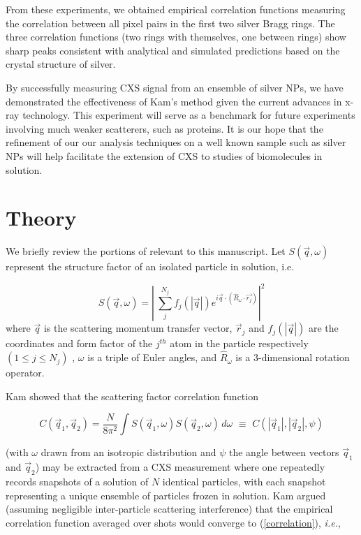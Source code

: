 \documentclass [11pt,fleqn]{article}
\def \be {\begin{equation}}
\def \ee {\end{equation}}
\begin{document}
From these experiments, we obtained empirical correlation functions measuring the correlation between all pixel pairs in the first two silver Bragg rings. The three correlation functions (two rings with themselves, one between rings) show sharp peaks consistent with analytical and simulated predictions based on the crystal structure of silver.

By successfully measuring CXS signal from an ensemble of silver NPs, we have demonstrated the effectiveness of Kam's method given the current advances in x-ray technology. This experiment will serve as a benchmark for future experiments involving much weaker scatterers, such as proteins. It is our hope that the refinement of our our analysis techniques on a well known sample such as silver NPs will help facilitate the extension of CXS to studies of biomolecules in solution.

\section{Theory}

We briefly review the portions of \cite{Kam:1977wc} relevant to this manuscript. Let $S( \vec{q},\omega)$ represent the structure factor of an isolated particle in solution, i.e.

\be \label{structurefactor}
S(\vec{q},\omega) = \left| \> \sum_{j}^{N_j} f_j (|\vec{q}| )e^{i \vec{q} \cdot  \left( \hat{R}_\omega \cdot \vec{r_j}\right)  } \right| ^{2}
\ee
where $\vec{q}$ is the scattering momentum transfer vector,  $\vec{r}_{j}$ and $f_j (|\vec{q}| )$ are the coordinates and form factor of the $j^{th}$ atom in the particle respectively $( 1 \leq j \leq N_{j} )$ , $\omega$ is a triple of Euler angles, and $\hat{R}_\omega$ is a 3-dimensional rotation operator.

Kam showed that the scattering factor correlation function

\be \label{correlation}
C(\vec{q}_1, \vec{q}_2) = \frac{N}{8 \pi^{2}}\int S( \vec{q}_{1},\omega ) S( \vec{q}_{2},\omega ) \, d \omega \,\, \equiv\,\, C(|\vec{q}_1|, |\vec{q}_2|,\psi)
\ee

(with $\omega$ drawn from an isotropic distribution and $\psi$ the angle between vectors $\vec{q}_{1}$ and  $\vec{q}_{2}$)  may be extracted from a CXS measurement where one repeatedly records snapshots of a solution of $N$ identical particles, with each snapshot representing a unique ensemble of particles frozen in solution. Kam argued (assuming negligible inter-particle scattering interference) that the empirical correlation function averaged over shots would converge to (\ref{correlation}), \textit{i.e.},
\end{document}
